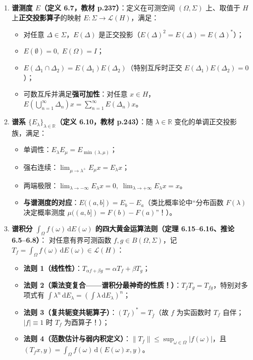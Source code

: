 \documentclass[11pt,a4paper]{article}
\providecommand{\tightlist}{\setlength{\itemsep}{2pt}\setlength{\parskip}{0pt}}
\begin{document}
\begin{enumerate}
\def\labelenumi{\arabic{enumi}.}
\tightlist
\item
  \textbf{谱测度 \(E\)（定义 6.7，教材 p.237）}：定义在可测空间 \((\Omega, \Sigma)\) 上、取值于 \(H\) 上\textbf{正交投影算子}的映射 \(E: \Sigma \to \mathcal{L}(H)\)，满足：

  \begin{itemize}
  \tightlist
  \item
    对任意 \(\Delta \in \Sigma\)，\(E(\Delta)\) 是正交投影（\(E(\Delta)^2 = E(\Delta) = E(\Delta)^*\)）；
  \item
    \(E(\emptyset) = 0,\; E(\Omega) = I\)；
  \item
    \(E(\Delta_1 \cap \Delta_2) = E(\Delta_1)E(\Delta_2)\)（特别互斥时正交 \(E(\Delta_1)E(\Delta_2) = 0\)）；
  \item
    可数互斥并满足\textbf{强可加性}：对任意 \(x \in H\)，\(E\!\left(\bigcup_{n=1}^\infty \Delta_n\right)x = \sum_{n=1}^\infty E(\Delta_n)x\)。
  \end{itemize}
\item
  \textbf{谱系 \(\{E_\lambda\}_{\lambda\in\mathbb{R}}\)（定义 6.10，教材 p.243）}：随 \(\lambda \in \mathbb{R}\) 变化的单调正交投影族，满足：

  \begin{itemize}
  \tightlist
  \item
    单调性：\(E_\lambda E_\mu = E_{\min(\lambda, \mu)}\)；
  \item
    强右连续：\(\lim_{\mu \to \lambda^+} E_\mu x = E_\lambda x\)；
  \item
    两端极限：\(\lim_{\lambda \to -\infty} E_\lambda x = 0,\; \lim_{\lambda \to +\infty} E_\lambda x = x\)。
  \item
    \textbf{与谱测度的对应}：\(E((a, b]) = E_b - E_a\)（类比概率论中``分布函数 \(F(\lambda)\) 决定概率测度 \(\mu((a,b]) = F(b)-F(a)\)''！）。
  \end{itemize}
\item
  \textbf{谱积分 \(\int_\Omega f(\omega)\,\mathrm{d}E(\omega)\) 的四大黄金运算法则（定理 6.15--6.16、推论 6.5--6.8）}： 对任意有界可测函数 \(f, g \in B(\Omega, \Sigma)\)，记 \(T_f = \int_\Omega f(\omega)\,\mathrm{d}E(\omega) \in \mathcal{L}(H)\)：

  \begin{itemize}
  \tightlist
  \item
    \textbf{法则 1（线性性）}：\(T_{\alpha f + \beta g} = \alpha T_f + \beta T_g\)；
  \item
    \textbf{法则 2（乘法变复合——谱积分最神奇的性质！）}：\(T_f T_g = T_{fg}\)，特别对多项式有 \(\int \lambda^n\,\mathrm{d}E_\lambda = \left(\int \lambda\,\mathrm{d}E_\lambda\right)^n\)；
  \item
    \textbf{法则 3（复共轭变共轭算子）}：\((T_f)^* = T_{\bar{f}}\)（故 \(f\) 为实函数时 \(T_f\) 自伴；\(\lvert f\rvert \equiv 1\) 时 \(T_f\) 为酉算子！）；
  \item
    \textbf{法则 4（范数估计与弱内积定义）}：\(\lVert T_f\rVert \le \sup_{\omega\in\Omega}\lvert f(\omega)\rvert\)，且 \((T_f x, y) = \int_\Omega f(\omega)\,\mathrm{d}(E(\omega)x, y)\)。
  \end{itemize}
\end{enumerate}
\end{document}
